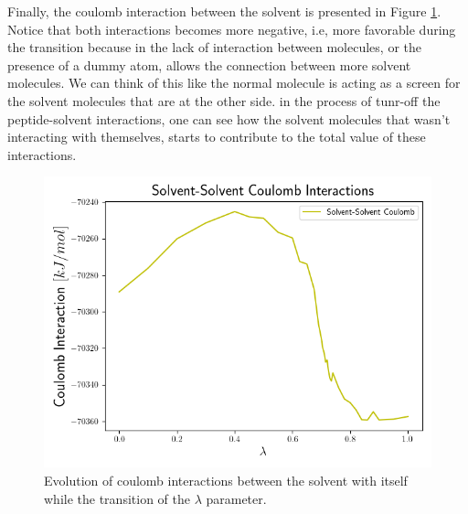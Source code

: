 Finally, the coulomb interaction between the solvent is presented in Figure \ref{fig:solvent_coul}. Notice that both interactions becomes more negative, i.e, more favorable during the transition because in the lack of interaction between molecules, or the presence of a dummy atom, allows the connection between more solvent molecules. We can think of this like the normal molecule is acting as a screen for the solvent molecules that are at the other side. in the process of tunr-off the peptide-solvent interactions, one can see how the solvent molecules that wasn't interacting with themselves, starts to contribute to the total value of these interactions. 
\begin{figure}[h]
    \centering
    \includegraphics[scale=0.7]{Figures/Chapter_6/Solvent_coul_Interactions.png}
    \caption{Evolution of coulomb interactions between the solvent with itself while the transition of the $\lambda$ parameter.}
    \label{fig:solvent_coul}
\end{figure}

